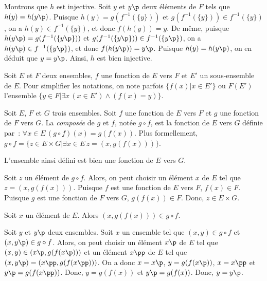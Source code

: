     Montrons que $h$ est injective. 
    Soit $y$ et $y\p$ deux éléments de $F$ tels que $h(y) = h(y\p)$. 
    Puisque $h(y) = g (f^{-1}(\lbrace y \rbrace))$ et $g (f^{-1}(\lbrace y \rbrace)) \in f^{-1}(\lbrace y \rbrace)$, on a $h(y) \in f^{-1}(\lbrace y \rbrace)$, et donc $f(h(y)) = y$.
    De même, puisque $h(y\p) = g (f^{-1}(\lbrace y\p \rbrace))$ et $g (f^{-1}(\lbrace y\p \rbrace)) \in f^{-1}(\lbrace y\p \rbrace)$, on a $h(y\p) \in f^{-1}(\lbrace y\p \rbrace)$, et donc $f(h(y\p)) = y\p$.
    Puisque $h(y) = h(y\p)$, on en déduit que $y = y\p$. 
    Ainsi, $h$ est bien injective. 

   \done 

\blank[medium]

Soit $E$ et $F$ deux ensembles, $f$ une fonction de $E$ vers $F$ et $E'$ un sous-ensemble de $E$. 
Pour simplifier les notations, on note parfois $\lbrace f(x) \vert x \in E' \rbrace$ ou $F(E')$ l'ensemble $\lbrace y \in F \vert \exists x \, (x \in E') \wedge (f(x) = y) \rbrace$. 

\blank[medium]

\noindent{} Soit $E$, $F$ et $G$ trois ensembles. 
    Soit $f$ une fonction de $E$ vers $F$ et $g$ une fonction de $F$ vers $G$. 
    La \emph{composée} de $g$ et $f$, notée $g \circ f$, est la fonction de $E$ vers $G$ définie par : $\forall x \in E \, (g \circ f) (x) = g(f(x))$. 
    Plus formellement, $g \circ f = \lbrace z \in E \times G \vert \exists x \in E \, z = (x,g(f(x))) \rbrace$.

\blank[medium]

\noindent{} L'ensemble ainsi défini est bien une fonction de $E$ vers $G$.

\blank[medium]

\noindent{} 
\startitemize[nowhite]
    \item Soit $z$ un élément de $g \circ f$. 
        Alors, on peut choisir un élément $x$ de $E$ tel que $z = (x,g(f(x)))$. 
        Puisque $f$ est une fonction de $E$ vers $F$, $f(x) \in F$.
        Puisque $g$ est une fonction de $F$ vers $G$, $g(f(x)) \in F$.
        Donc, $z \in E \times G$.
    \item Soit $x$ un élément de $E$. Alors $(x,g(f(x))) \in g \circ f$.
    \item Soit $y$ et $y\p$ deux ensembles. 
        Soit $x$ un ensemble tel que $(x,y) \in g \circ f$ et $(x,y\p) \in g \circ f$. 
        Alors, on peut choisir un élément $x\p$ de $E$ tel que $(x,y) \in (x\p,g(f(x\p)))$ et un élément $x\pp$ de $E$ tel que $(x,y\p) = (x\pp,g(f(x\pp)))$. 
        On a donc $x = x\p$, $y = g(f(x\p))$, $x = x\pp$ et $y\p = g(f(x\pp))$. 
        Donc, $y = g(f(x))$ et $y\p = g(f(x))$. 
        Donc, $y = y\p$.
\stopitemize

